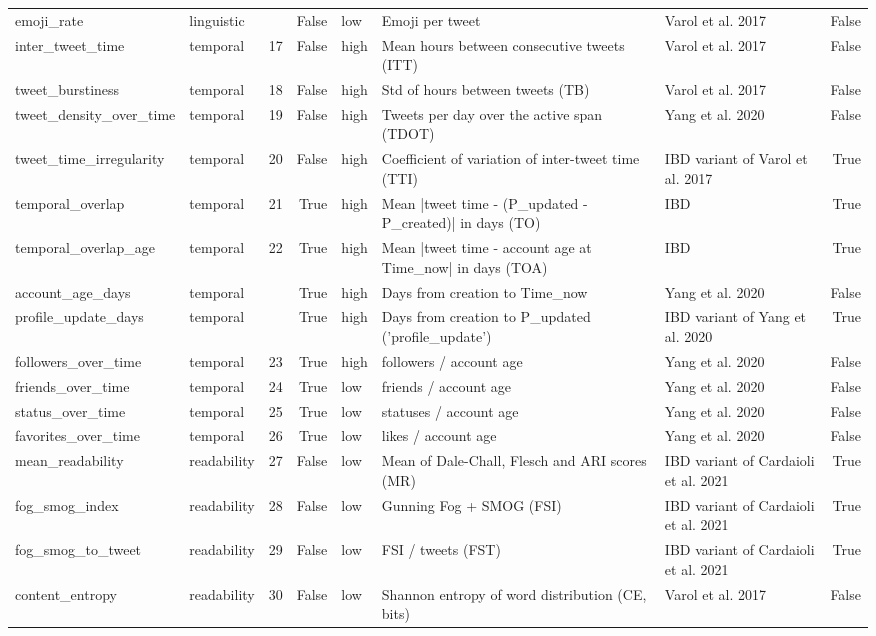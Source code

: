 \begin{tabular}{lllrlllr}
emoji_rate & linguistic &  & False & low & Emoji per tweet & Varol et al. 2017 & False \\
inter_tweet_time & temporal & 17 & False & high & Mean hours between consecutive tweets (ITT) & Varol et al. 2017 & False \\
tweet_burstiness & temporal & 18 & False & high & Std of hours between tweets (TB) & Varol et al. 2017 & False \\
tweet_density_over_time & temporal & 19 & False & high & Tweets per day over the active span (TDOT) & Yang et al. 2020 & False \\
tweet_time_irregularity & temporal & 20 & False & high & Coefficient of variation of inter-tweet time (TTI) & IBD variant of Varol et al. 2017 & True \\
temporal_overlap & temporal & 21 & True & high & Mean |tweet time - (P_updated - P_created)| in days (TO) & IBD & True \\
temporal_overlap_age & temporal & 22 & True & high & Mean |tweet time - account age at Time_now| in days (TOA) & IBD & True \\
account_age_days & temporal &  & True & high & Days from creation to Time_now & Yang et al. 2020 & False \\
profile_update_days & temporal &  & True & high & Days from creation to P_updated ('profile_update') & IBD variant of Yang et al. 2020 & True \\
followers_over_time & temporal & 23 & True & high & followers / account age & Yang et al. 2020 & False \\
friends_over_time & temporal & 24 & True & low & friends / account age & Yang et al. 2020 & False \\
status_over_time & temporal & 25 & True & low & statuses / account age & Yang et al. 2020 & False \\
favorites_over_time & temporal & 26 & True & low & likes / account age & Yang et al. 2020 & False \\
mean_readability & readability & 27 & False & low & Mean of Dale-Chall, Flesch and ARI scores (MR) & IBD variant of Cardaioli et al. 2021 & True \\
fog_smog_index & readability & 28 & False & low & Gunning Fog + SMOG (FSI) & IBD variant of Cardaioli et al. 2021 & True \\
fog_smog_to_tweet & readability & 29 & False & low & FSI / tweets (FST) & IBD variant of Cardaioli et al. 2021 & True \\
content_entropy & readability & 30 & False & low & Shannon entropy of word distribution (CE, bits) & Varol et al. 2017 & False \\

\end{tabular}
